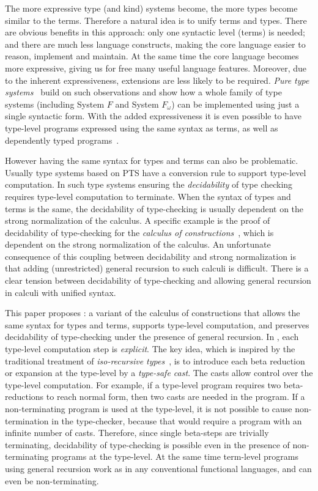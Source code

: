 The more expressive type (and kind) systems become, the more types become similar
to the terms. Therefore a natural idea is to unify terms and
types. There are obvious benefits in this approach: only one syntactic
level (terms) is needed; and there are much less language constructs,
making the core language easier to reason, implement and maintain. At the same
time the core language becomes more expressive, giving us for free
many useful language features. Moreover, due to the inherent
expressiveness, extensions are less likely to be required.
\emph{Pure type systems}~\cite{handbook} build
on such observations and show how a whole family of type systems
(including System $F$ and System $F_{\omega}$) can be implemented
using just a single syntactic form. With the added expressiveness it
is even possible to have type-level programs expressed using the same
syntax as terms, as well as dependently typed programs~\cite{coc}.

However having the same syntax for types and terms can also be
problematic. Usually type systems based on PTS have a conversion rule
to support type-level computation.  In such type systems ensuring the
\emph{decidability} of type checking requires type-level computation
to terminate. When the syntax of types and terms is the same, the
decidability of type-checking is usually dependent on the strong
normalization of the calculus. A specific example is the proof
of decidability of type-checking for the \emph{calculus of constructions}~\cite{pts:normalize},
which is dependent on the strong normalization of the
calculus. An unfortunate consequence of this coupling between
decidability and strong normalization is that adding (unrestricted)
general recursion to such calculi is difficult. There is a clear
tension between decidability of type-checking and allowing general
recursion in calculi with unified syntax.

This paper proposes \name: a variant of the calculus of constructions
that allows the same syntax for types and terms, supports type-level
computation, and preserves decidability of type-checking under the
presence of general recursion. In \name, each type-level computation
step is \emph{explicit}.  The key idea, which is inspired by the traditional
treatment of \emph{iso-recursive types}~\cite{tapl}, is to introduce each beta
reduction or expansion at the type-level by a \emph{type-safe
  cast}. The
casts allow control over the type-level computation. For example, if
a type-level program requires two beta-reductions to reach normal
form, then two casts are needed in the program. If a non-terminating
program is used at the type-level, it is not possible to cause
non-termination in the type-checker, because that would require a
program with an infinite number of casts. Therefore, since single beta-steps are
trivially terminating, decidability of type-checking is possible even
in the presence of non-terminating programs at the type-level. 
At the same time term-level programs using general recursion 
work as in any conventional functional languages, and can even 
be non-terminating. 

